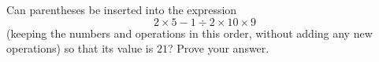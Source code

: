 Can parentheses be inserted into the expression
\[
2\times5-1\div2\times10\times9
\]
(keeping the numbers and operations in this order, without adding any new operations) so that its value is $21$? Prove your answer.
